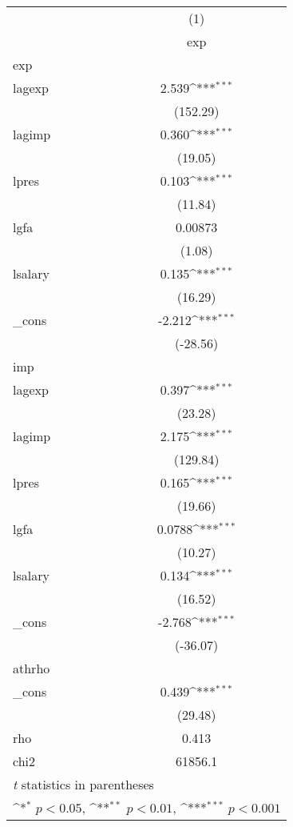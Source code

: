 {
\def\sym#1{\ifmmode^{#1}\else\(^{#1}\)\fi}
\begin{tabular}{l*{1}{c}}
\hline\hline
            &\multicolumn{1}{c}{(1)}\\
            &\multicolumn{1}{c}{exp}\\
\hline
exp         &                     \\
lagexp      &       2.539\sym{***}\\
            &    (152.29)         \\
[1em]
lagimp      &       0.360\sym{***}\\
            &     (19.05)         \\
[1em]
lpres       &       0.103\sym{***}\\
            &     (11.84)         \\
[1em]
lgfa        &     0.00873         \\
            &      (1.08)         \\
[1em]
lsalary     &       0.135\sym{***}\\
            &     (16.29)         \\
[1em]
\_cons      &      -2.212\sym{***}\\
            &    (-28.56)         \\
\hline
imp         &                     \\
lagexp      &       0.397\sym{***}\\
            &     (23.28)         \\
[1em]
lagimp      &       2.175\sym{***}\\
            &    (129.84)         \\
[1em]
lpres       &       0.165\sym{***}\\
            &     (19.66)         \\
[1em]
lgfa        &      0.0788\sym{***}\\
            &     (10.27)         \\
[1em]
lsalary     &       0.134\sym{***}\\
            &     (16.52)         \\
[1em]
\_cons      &      -2.768\sym{***}\\
            &    (-36.07)         \\
\hline
athrho      &                     \\
\_cons      &       0.439\sym{***}\\
            &     (29.48)         \\
\hline
rho         &       0.413         \\
chi2        &     61856.1         \\
\hline\hline
\multicolumn{2}{l}{\footnotesize \textit{t} statistics in parentheses}\\
\multicolumn{2}{l}{\footnotesize \sym{*} \(p<0.05\), \sym{**} \(p<0.01\), \sym{***} \(p<0.001\)}\\
\end{tabular}
}
